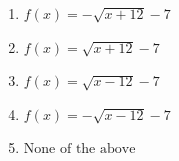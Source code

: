 \documentclass[14pt]{extbook}
\begin{document}
\begin{enumerate}
{\begin{center}
\end{center}
\begin{enumerate}[label=\Alph*.]
\item \( f(x) = - \sqrt{x + 12} - 7 \)
\item \( f(x) = \sqrt{x + 12} - 7 \)
\item \( f(x) = \sqrt{x - 12} - 7 \)
\item \( f(x) = - \sqrt{x - 12} - 7 \)
\item \( \text{None of the above} \)

\end{enumerate} }
\end{enumerate}
\end{document}
